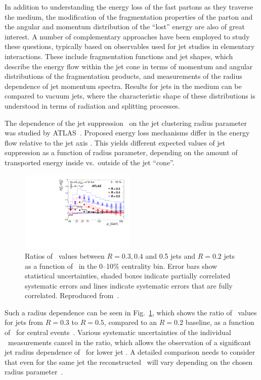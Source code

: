 In addition to understanding the energy loss of the fast partons as they traverse 
the medium, the modification of the fragmentation properties of the parton and 
the angular and momentum distribution of the ``lost'' energy are also of great interest.
A number of complementary approaches have been employed to study these questions,
typically based on observables used for jet studies in elementary interactions.
These include fragmentation functions and jet shapes, which describe the energy flow 
within the jet cone in terms of momentum and angular distributions 
of the fragmentation products, and measurements of the radius dependence
of jet momentum spectra.  Results for jets in the medium can
be compared to vacuum jets, where the characteristic shape of these
distributions is understood in terms of radiation and splitting 
processes.

The dependence of the jet suppression \Rcp\ on the jet clustering radius parameter 
was studied by ATLAS~\cite{Aad:2012is}. Proposed energy loss mechanisms differ 
in the energy flow relative to the jet axis \cite{Vitev:2008rz, Vitev:2009rd,
He:2011pd}. This yields different expected values of jet suppression as a 
function of radius parameter, depending on the amount of transported energy 
inside vs.\ outside of the jet ``cone''.
\begin{figure}[!th]
\begin{center}
\includegraphics[width=0.49\textwidth]{jetfigures/ATLAS_jetRCP_size.pdf}
\caption{
Ratios of \Rcp\ values between $R = 0.3, 0.4$ and 0.5 jets and $R =
0.2$ jets as a function of \pT\ in the 0--10\% centrality bin.
Error bars show statistical uncertainties, shaded boxes
indicate partially correlated systematic errors and lines indicate
systematic errors that are fully correlated.
Reproduced from~\cite{Aad:2012is}.
}
\label{fig:GR:ATLAS_jetRCP_size}
\end{center}
\end{figure}

Such a radius dependence can be seen in Fig.~\ref{fig:GR:ATLAS_jetRCP_size}, which
shows the ratio of \Rcp\ values for jets from $R=0.3$ to $R=0.5$, compared
to an $R = 0.2$ baseline, as a function of \pT\ for central events~\cite{Aad:2012is}.
Various systematic uncertainties of the individual \Rcp\ measurements 
cancel in the ratio, which allows the observation of a significant jet radius 
dependence of \Rcp\ for lower jet \pT. A detailed comparison needs to consider 
that even for the same jet the reconstructed \pT\ will vary 
depending on the chosen radius parameter~\cite{Aad:2012is}.


